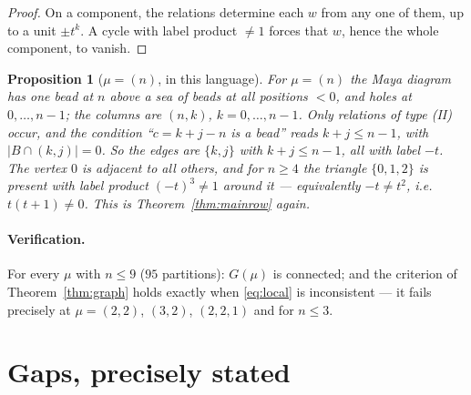 \documentclass[11pt]{article}
\newtheorem{proposition}[theorem]{Proposition}
\theoremstyle{definition}
\begin{document}
\begin{proof}
On a component, the relations determine each $w$ from any one of them, up to a unit
$\pm t^{k}$. A cycle with label product $\ne1$ forces that $w$, hence the whole component, to
vanish.
\end{proof}

\begin{proposition}[$\mu=(n)$, in this language]
For $\mu=(n)$ the Maya diagram has one bead at $n$ above a sea of beads at all positions
$<0$, and holes at $0,\dots,n-1$; the columns are $(n,k)$, $k=0,\dots,n-1$. Only relations of
type (II) occur, and the condition ``$c=k+j-n$ is a bead'' reads $k+j\le n-1$, with
$|B\cap(k,j)|=0$. So the edges are $\{k,j\}$ with $k+j\le n-1$, all with label $-t$. The
vertex $0$ is adjacent to all others, and for $n\ge4$ the triangle $\{0,1,2\}$ is present with
label product $(-t)^{3}\ne1$ around it --- equivalently $-t\ne t^2$, i.e.\ $t(t+1)\ne0$. This
is Theorem~\ref{thm:mainrow} again.
\end{proposition}

\paragraph{Verification.} For every $\mu$ with $n\le9$ ($95$ partitions): $G(\mu)$ is
connected; and the criterion of Theorem~\ref{thm:graph} holds exactly when \eqref{eq:local}
is inconsistent --- it fails precisely at $\mu=(2,2)$, $(3,2)$, $(2,2,1)$ and for $n\le3$.

\section{Gaps, precisely stated}\label{sec:gaps}
\end{document}
